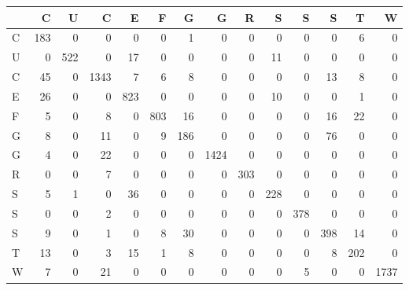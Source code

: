 \begin{tabular}{lrrrrrrrrrrrrr}
\toprule
{} &    C &    U &     C &    E &    F &    G &     G &    R &    S &    S &    S &    T &     W \\
\midrule
C &  183 &    0 &     0 &    0 &    0 &    1 &     0 &    0 &    0 &    0 &    0 &    6 &     0 \\
U &    0 &  522 &     0 &   17 &    0 &    0 &     0 &    0 &   11 &    0 &    0 &    0 &     0 \\
C &   45 &    0 &  1343 &    7 &    6 &    8 &     0 &    0 &    0 &    0 &   13 &    8 &     0 \\
E &   26 &    0 &     0 &  823 &    0 &    0 &     0 &    0 &   10 &    0 &    0 &    1 &     0 \\
F &    5 &    0 &     8 &    0 &  803 &   16 &     0 &    0 &    0 &    0 &   16 &   22 &     0 \\
G &    8 &    0 &    11 &    0 &    9 &  186 &     0 &    0 &    0 &    0 &   76 &    0 &     0 \\
G &    4 &    0 &    22 &    0 &    0 &    0 &  1424 &    0 &    0 &    0 &    0 &    0 &     0 \\
R &    0 &    0 &     7 &    0 &    0 &    0 &     0 &  303 &    0 &    0 &    0 &    0 &     0 \\
S &    5 &    1 &     0 &   36 &    0 &    0 &     0 &    0 &  228 &    0 &    0 &    0 &     0 \\
S &    0 &    0 &     2 &    0 &    0 &    0 &     0 &    0 &    0 &  378 &    0 &    0 &     0 \\
S &    9 &    0 &     1 &    0 &    8 &   30 &     0 &    0 &    0 &    0 &  398 &   14 &     0 \\
T &   13 &    0 &     3 &   15 &    1 &    8 &     0 &    0 &    0 &    0 &    8 &  202 &     0 \\
W &    7 &    0 &    21 &    0 &    0 &    0 &     0 &    0 &    0 &    5 &    0 &    0 &  1737 \\
\bottomrule
\end{tabular}
